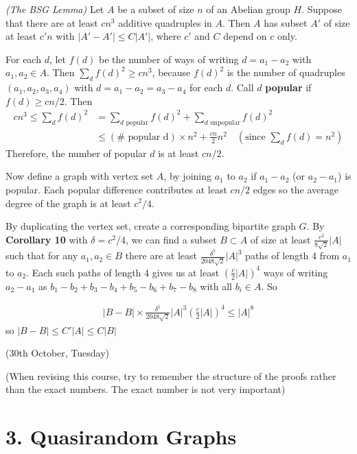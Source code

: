 \documentclass[10pt,a4paper]{report}
\newenvironment{proof}
{\begin{changemargin}{1cm}{0.5cm}
	}%
	{\end{changemargin}
}
\begin{document}
 \emph{(The BSG Lemma)} Let $A$ be a subset of size $n$ of an Abelian group $H$. Suppose that there are at least $cn^3$ additive quadruples in $A$. Then $A$ has subset $A'$ of size at least $c'n$ with $|A'-A'| \leq C|A'|$, where $c'$ and $C$ depend on $c$ only.
\begin{proof}
\pf For each $d$, let $f(d)$ be the number of ways of writing $d = a_1 -a_2$ with $a_1, a_2 \in A$. Then $\sum_d f(d)^2 \geq cn^3$, because $f(d)^2$ is the number of quadruples $(a_1,a_2, a_3, a_4)$ with $d=a_1 - a_2 = a_3 - a_4$ for each $d$. Call $d$ \textbf{popular} if $f(d)\geq cn/2$. Then
\begin{align*}
cn^3 \leq \sum_d f(d)^2 &= \sum_{d \text{ popular}} f(d)^2 + \sum_{d \text{ unpopular}} f(d)^2 \\
&\leq ( \# \text{ popular d}) \times n^2 + \frac{cn}{2} n^2 \quad (\text{since } \sum_d f(d) = n^2)
\end{align*}
Therefore, the number of popular $d$ is at least $cn/2$.

\quad Now define a graph with vertex set $A$, by joining $a_1$ to $a_2$ if $a_1 -a_2$ (or $a_2 -a_1$) is popular. Each popular difference contributes at least $cn/2$ edges so the average degree of the graph is at least $c^2/4$.

\quad By duplicating the vertex set, create a corresponding bipartite graph $G$. By \textbf{Corollary 10} with $\delta = c^2/4$, we can find a subset $B\subset A$ of size at least $\frac{c^2}{8\sqrt{2}} |A|$ such that for any $a_1,a_2 \in B$ there are at least $\frac{\delta^5}{2048\sqrt{2}} |A|^3$ paths of length 4 from $a_1$ to $a_2$. Each such paths of length 4 gives us at least $(\frac{c}{2}|A|)^4$ ways of writing $a_2 -a_1$ as $b_1 -b_2 + b_3 -b_4 +b_5 -b_6 +b_7 -b_8$ with all $b_i \in A$. So

\begin{align*}
|B-B| \times \frac{\delta^5}{2048 \sqrt{2}} |A|^3 (\frac{c}{2}|A|)^4 \leq |A|^8
\end{align*}
so $|B-B|\leq C'|A| \leq C|B|$

\eop
\end{proof}
\s

\newday

(30th October, Tuesday)
\s

(When revising this course, try to remember the structure of the proofs rather than the exact numbers. The exact number is not very important)

\section*{3. Quasirandom Graphs}
\end{document}
